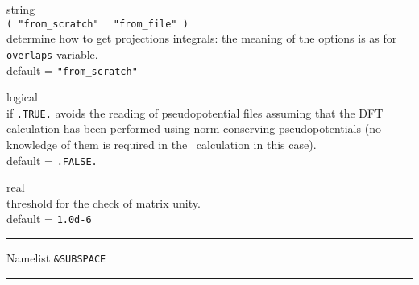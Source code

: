 {\noindent{}%
{\sc string} \\ {\tt ( "from\_scratch" $\mid$ "from\_file" ) }\\
determine how to get projections integrals:
the meaning of the options is as for {\tt overlaps} variable.\\
{\sc default} = {\tt "from\_scratch"} \par

\noindent{}%
{\sc logical} \\ if {\tt .TRUE.} avoids the reading of pseudopotential files
assuming that the DFT calculation has been performed using norm-conserving
pseudopotentials (no knowledge of them is required in the \WANT\ calculation
in this case).\\
{\sc default} = {\tt .FALSE.} \par

\noindent{}%
{\sc real} \\ threshold for the check of matrix unity.\\
{\sc default} = {\tt 1.0d-6} \par
}\bigskip

\begin{centering}
\rule{2.2in}{0.01in} Namelist {\tt \&SUBSPACE} \rule{2.2in}{0.01in}
\end{centering}\\

